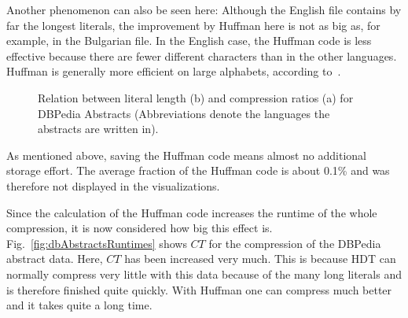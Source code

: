 Another phenomenon can also be seen here: Although the English file contains by far the longest literals, the improvement by Huffman here is not as big as, for example, in the Bulgarian file. In the English case, the Huffman code is less effective because there are fewer different characters than in the other languages. Huffman is generally more efficient on large alphabets, according to~\cite{huffman}.

\begin{figure}[h]
	\centering
	\hfill
	\caption{Relation between literal length (b) and compression ratios (a) for DBPedia Abstracts (Abbreviations denote the languages the abstracts are written in).}
	\label{fig:dbAbstracts}
\end{figure}

As mentioned above, saving the Huffman code means almost no additional storage effort. The average fraction of the Huffman code is about 0.1\% and was therefore not displayed in the visualizations.

Since the calculation of the Huffman code increases the runtime of the whole compression, it is now considered how big this effect is. Fig.~\ref{fig:dbAbstractsRuntimes} shows $CT$ for the compression of the DBPedia abstract data. Here, $CT$ has been increased very much. This is because HDT can normally compress very little with this data because of the many long literals and is therefore finished quite quickly. With Huffman one can compress much better and it takes quite a long time.

